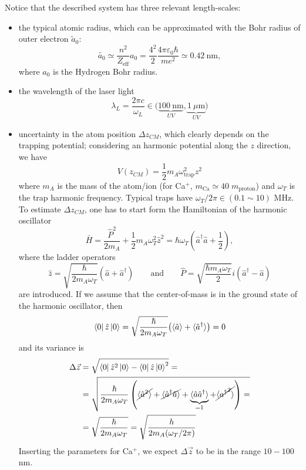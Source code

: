 Notice that the described system has three relevant length-scales:
\begin{itemize}   
    \item the typical atomic radius, which can be approximated with the Bohr radius of outer electron $\tilde{a}_0$:
    \begin{equation*}
    \tilde{a_0} \simeq \frac{n^2}{Z_{\text{eff}}} a_0 =
\frac{4^2}{2}\frac{4\pi \varepsilon_0 \hbar}{m e^2} \simeq 0.42 ~\text{nm}, 
    \end{equation*}
    where $a_0$ is the Hydrogen Bohr radius.
    
    \item the wavelength of the laser light
    $$\lambda_L = \frac{2\pi c}{\omega_L} \in \big( \underbrace{100~\text{nm}}_{UV}, \underbrace{1~\mu\text{m}}_{UV} \big)$$

    \item uncertainty in the atom position $\Delta z_{CM}$, which clearly depends on the trapping potential; considering an harmonic potential along the $z$ direction, we have
    $$V(z_{CM}) = \frac{1}{2}m_A\omega_\text{trap}^2z^2$$
    where $m_A$ is the mass of the atom/ion (for Ca$^+$, $m_\text{Ca} \simeq 40\;m_\text{proton}$) and $\omega_T$ is the trap harmonic frequency. Typical traps have $\omega_T/2\pi \in (0.1 \sim 10)$ MHz. \\
    To estimate $\Delta z_{CM}$, one has to start form the Hamiltonian of the harmonic oscillator
    $$\bar{H} = \frac{\hat{P}^2}{2m_A} + \frac{1}{2}m_A\omega_T^2\hat{z}^2 =
    \hbar\omega_T\left(\hat{a}^\dag \hat{a} +\frac{1}{2}\right),$$
    where the ladder operators 
    \begin{equation*}
    \hat{z} = \sqrt{\frac{\hbar}{2m_A\omega_T}}\left(\hat{a}+\hat{a}^\dag\right)
    \qquad \text{and} \qquad 
    \hat{P} = \sqrt{\frac{\hbar m_A\omega_T}{2}}i\left(\hat{a}^\dag-\hat{a}\right) 
    \end{equation*}
    are introduced. If we assume that the center-of-mass is in the ground state of the harmonic oscillator, then
    \begin{align*}
        \bra{0}\hat{z}\ket{0} = 
        \sqrt{\frac{\hbar}{2m_A\omega_T}}
        \big( \langle \hat{a}\rangle + \langle \hat{a}^\dag\rangle \big)
        =0
    \end{align*}
    and its variance is
    \begin{align*}
        \Delta \vec{z} & = \sqrt{\bra{0} \hat{z}^2\ket{0} - \bra{0}\hat{z}\ket{0}^2} = \\
        & =
        \sqrt{\frac{\hbar}{2m_A\omega_T}
        \left(
        \cancel{\langle \hat{a}^2\rangle}
        + \cancel{\langle \hat{a}^\dag \hat{a} \rangle}
        + \underbrace{\langle \hat{a} \hat{a}^\dag
        \rangle}_{=1}
        +\cancel{\langle {a^\dag}^2\rangle}
        \right) =
        }\\
        & = \sqrt{\frac{\hbar}{2m_A\omega_T}} = 
        \sqrt{\frac{h}{2m_A(\omega_T/2\pi)}}
    \end{align*}
    Inserting the parameters for Ca$^+$, we expect $\Delta \vec{z}$ to be in the range $10-100$ nm. 
\end{itemize}
